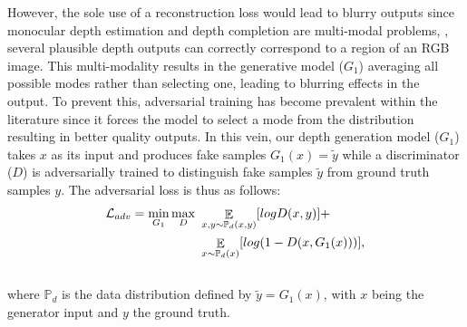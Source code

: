 \documentclass[10pt,twocolumn,letterpaper]{article}
\begin{document}
However, the sole use of a reconstruction loss would lead to blurry outputs since monocular depth estimation and depth completion are multi-modal problems, \ie, several plausible depth outputs can correctly correspond to a region of an RGB image. This multi-modality results in the generative model ($G_1$) averaging all possible modes rather than selecting one, leading to blurring effects in the output. To prevent this, adversarial training \cite{goodfellow2014generative} has become prevalent within the literature \cite{atapour2018real, dosovitskiy2016generating, isola2016image, pathak2016context, yeh2017semantic} since it forces the model to select a mode from the distribution resulting in better quality outputs. In this vein, our depth generation model ($G_1$) takes $x$ as its input and produces fake samples $G_1(x) = \tilde{y}$ while a discriminator ($D$) is adversarially trained to distinguish fake samples $\tilde{y}$ from ground truth samples $y$. The adversarial loss is thus as follows:\vspace{-0.05cm}\begin{equation}
\begin{split}  
\mathcal{L}_{adv} = \min_{G_1} \max_{D}\ & \mathop{\mathbb{E}}_{x,y \sim \mathbb{P}_{d}(x,y)} [log D(x,y)] + \\
& \mathop{\mathbb{E}}_{x \sim \mathbb{P}_{d}(x)} [log(1 - D(x, G_1(x)))],
\label{lossAdv}\vspace{-7cm}
\end{split}\vspace{-6cm}
\end{equation}\\
where $\mathbb{P}_{d}$ is the data distribution defined by $\tilde{y} = G_1(x)$, with $x$ being the generator input and $y$ the ground truth.
\end{document}
